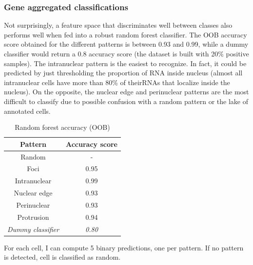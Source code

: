 \subsubsection{Gene aggregated classifications}


Not surprisingly, a feature space that discriminates well between classes also performs well when fed into a robust random forest classifier.
The \ac{OOB} accuracy score obtained for the different patterns is between 0.93 and 0.99, while a dummy classifier would return a 0.8 accuracy score (the dataset is built with 20\% positive samples).
The intranuclear pattern is the easiest to recognize.
In fact, it could be predicted by just thresholding the proportion of \ac{RNA} inside nucleus (almost all intranuclear cells have more than 80\% of their\ac{RNA}s that localize inside the nucleus).
On the opposite, the nuclear edge and perinuclear patterns are the most difficult to classify due to possible confusion with a random pattern or the lake of annotated cells.

\begin{table}
	\centering
	\begin{tabular}{| c | c |}
		\hline
		Pattern & Accuracy score\\
		\hline
		Random & -\\
		Foci & 0.95\\
		Intranuclear & 0.99\\
		Nuclear edge & 0.93\\
		Perinuclear & 0.93\\
		Protrusion & 0.94\\
		\hline
		\textit{Dummy classifier} & \textit{0.80}\\
		\hline
	\end{tabular}
	\caption{Random forest accuracy (OOB)}
	\label{table:accuracy_oob}
\end{table}

For each cell, I can compute 5 binary predictions, one per pattern.
If no pattern is detected, cell is classified as random.






